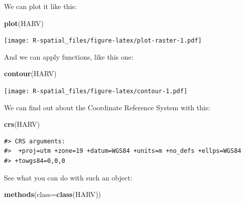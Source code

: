 \documentclass[]{book}
\newenvironment{Shaded}{\begin{snugshade}}{\end{snugshade}}
\newcommand{\KeywordTok}[1]{\textcolor[rgb]{0.13,0.29,0.53}{\textbf{#1}}}
\newcommand{\DataTypeTok}[1]{\textcolor[rgb]{0.13,0.29,0.53}{#1}}
\newcommand{\NormalTok}[1]{#1}
\theoremstyle{definition}
\theoremstyle{definition}
\theoremstyle{definition}
\theoremstyle{remark}
\begin{document}
We can plot it like this:

\begin{Shaded}
\begin{Highlighting}[]
\KeywordTok{plot}\NormalTok{(HARV)}
\end{Highlighting}
\end{Shaded}

\texttt{[image: R-spatial\_files/figure-latex/plot-raster-1.pdf]}

And we can apply functions, like this one:

\begin{Shaded}
\begin{Highlighting}[]
\KeywordTok{contour}\NormalTok{(HARV)}
\end{Highlighting}
\end{Shaded}

\texttt{[image: R-spatial\_files/figure-latex/contour-1.pdf]}

We can find out about the Coordinate Reference System with this:

\begin{Shaded}
\begin{Highlighting}[]
\KeywordTok{crs}\NormalTok{(HARV)}
\end{Highlighting}
\end{Shaded}

\begin{verbatim}
#> CRS arguments:
#>  +proj=utm +zone=19 +datum=WGS84 +units=m +no_defs +ellps=WGS84
#> +towgs84=0,0,0
\end{verbatim}

See what you can do with such an object:

\begin{Shaded}
\begin{Highlighting}[]
\KeywordTok{methods}\NormalTok{(}\DataTypeTok{class=}\KeywordTok{class}\NormalTok{(HARV))}
\end{Highlighting}
\end{Shaded}
\end{document}
